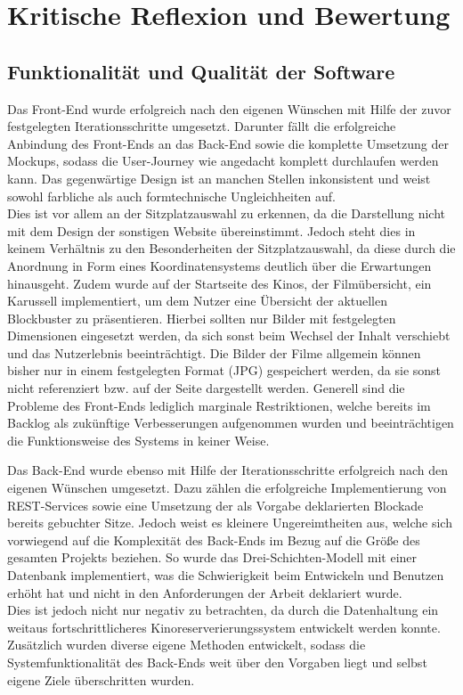 \section{Kritische Reflexion und Bewertung}
\multipleauthorsection{\authorRF}{\authorEJ}

\subsection{Funktionalität und Qualität der Software}

Das Front-End wurde erfolgreich nach den eigenen Wünschen mit Hilfe der zuvor festgelegten Iterationsschritte umgesetzt.
Darunter fällt die erfolgreiche Anbindung des Front-Ends an das Back-End sowie die komplette Umsetzung der Mockups, sodass die User-Journey wie angedacht komplett durchlaufen werden kann.
Das gegenwärtige Design ist an manchen Stellen inkonsistent und weist sowohl farbliche als auch formtechnische Ungleichheiten auf. \\
Dies ist vor allem an der Sitzplatzauswahl zu erkennen, da die Darstellung nicht mit dem Design der sonstigen Website übereinstimmt.
Jedoch steht dies in keinem Verhältnis zu den Besonderheiten der Sitzplatzauswahl, da diese durch die Anordnung in Form eines Koordinatensystems deutlich über die Erwartungen hinausgeht.
Zudem wurde auf der Startseite des Kinos, der Filmübersicht, ein Karussell implementiert, um dem Nutzer eine Übersicht der aktuellen Blockbuster zu präsentieren.
Hierbei sollten nur Bilder mit festgelegten Dimensionen eingesetzt werden, da sich sonst beim Wechsel der Inhalt verschiebt und das Nutzerlebnis beeinträchtigt.
Die Bilder der Filme allgemein können bisher nur in einem festgelegten Format (JPG) gespeichert werden, da sie sonst nicht referenziert bzw. auf der Seite dargestellt werden.
Generell sind die Probleme des Front-Ends lediglich marginale Restriktionen, welche bereits im Backlog als zukünftige Verbesserungen aufgenommen wurden und beeinträchtigen die Funktionsweise des Systems in keiner Weise.

Das Back-End wurde ebenso mit Hilfe der Iterationsschritte erfolgreich nach den eigenen Wünschen umgesetzt.
Dazu zählen die erfolgreiche Implementierung von \acs{REST}-Services sowie eine Umsetzung der als Vorgabe deklarierten Blockade bereits gebuchter Sitze.
Jedoch weist es kleinere Ungereimtheiten aus, welche sich vorwiegend auf die Komplexität des Back-Ends im Bezug auf die Größe des gesamten Projekts beziehen.
So wurde das Drei-Schichten-Modell mit einer Datenbank implementiert, was die Schwierigkeit beim Entwickeln und Benutzen erhöht hat und nicht in den Anforderungen der Arbeit deklariert wurde. \\
Dies ist jedoch nicht nur negativ zu betrachten, da durch die Datenhaltung ein weitaus fortschrittlicheres Kinoreserverierungssystem entwickelt werden konnte.
Zusätzlich wurden diverse eigene Methoden entwickelt, sodass die Systemfunktionalität des Back-Ends weit über den Vorgaben liegt und selbst eigene Ziele überschritten wurden.

